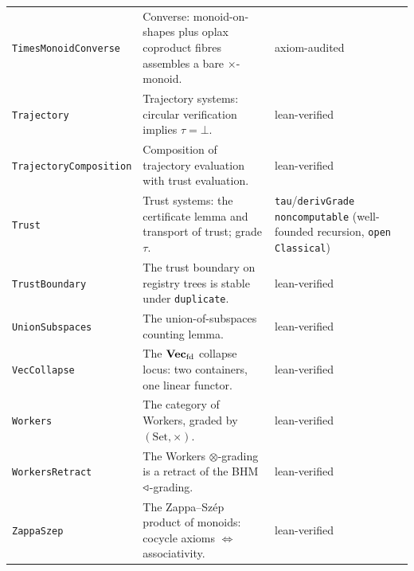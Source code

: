 \begin{longtable}{@{}p{}p{}p{}@{}}
\texttt{TimesMonoidConverse} & Converse: monoid-on-shapes plus oplax coproduct fibres assembles a bare $\times$-monoid. & axiom-audited \\
\texttt{Trajectory} & Trajectory systems: circular verification implies $\tau=\bot$. & lean-verified \\
\texttt{TrajectoryComposition} & Composition of trajectory evaluation with trust evaluation. & lean-verified \\
\texttt{Trust} & Trust systems: the certificate lemma and transport of trust; grade $\tau$. & \texttt{tau}/\texttt{derivGrade} \texttt{noncomputable} (well-founded recursion, \texttt{open Classical}) \\
\texttt{TrustBoundary} & The trust boundary on registry trees is stable under \texttt{duplicate}. & lean-verified \\
\texttt{UnionSubspaces} & The union-of-subspaces counting lemma. & lean-verified \\
\texttt{VecCollapse} & The $\mathbf{Vec}_{\mathrm{fd}}$ collapse locus: two containers, one linear functor. & lean-verified \\
\texttt{Workers} & The category of Workers, graded by $(\mathrm{Set},\times)$. & lean-verified \\
\texttt{WorkersRetract} & The Workers $\otimes$-grading is a retract of the BHM $\triangleleft$-grading. & lean-verified \\
\texttt{ZappaSzep} & The Zappa--Sz\'ep product of monoids: cocycle axioms $\iff$ associativity. & lean-verified \\

\end{longtable}

